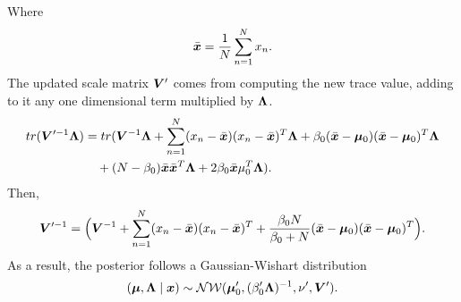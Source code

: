 Where
\[
  \bar{\bm{x}} = \frac{1}{N}\sum_{n=1}^{N}x_{n}.
\]
The updated scale matrix \(\bm{V}'\) comes from computing the new trace value, adding to it any one dimensional term multiplied by \(\bm{\Lambda}\).
\[
  \begin{aligned}
    tr(\bm{V}'^{-1} \bm{\Lambda}) &= tr(\bm{V}^{-1}\bm{\Lambda} + \sum_{n=1}^{N}(x_{n} - \bar{\bm{x}})(x_{n} - \bar{\bm{x}})^{T}\bm{\Lambda} + \beta_{0}(\bar{\bm{x}} - \bm{\mu}_{0})(\bar{\bm{x}} - \bm{\mu}_{0})^{T}\bm{\Lambda}\\
    &\quad+ (N - \beta_{0})\bar{\bm{x}}\bar{\bm{x}}^{T}\bm{\Lambda} + 2\beta_{0}\bar{\bm{x}}\mu_{0}^{T}\bm{\Lambda}).
  \end{aligned}
\]
Then,
\[
  \bm{V}'^{-1} = \Big(\bm{V}^{-1} + \sum_{n=1}^{N}(x_{n} - \bar{\bm{x}})(x_{n} - \bar{\bm{x}})^{T} + \frac{\beta_{0}N}{\beta_{0} + N}(\bar{\bm{x}} - \bm{\mu}_{0})(\bar{\bm{x}} - \bm{\mu}_{0})^{T}\Big).
\]
As a result, the posterior follows a Gaussian-Wishart distribution
\[
  (\bm{\mu}, \bm{\Lambda} \mid \bm{x}) \sim \mathcal{N}\mathcal{W}(\bm{\mu}_{0}', (\beta_{0}'\bm{\Lambda})^{-1}, \nu', \bm{V}').
\]
